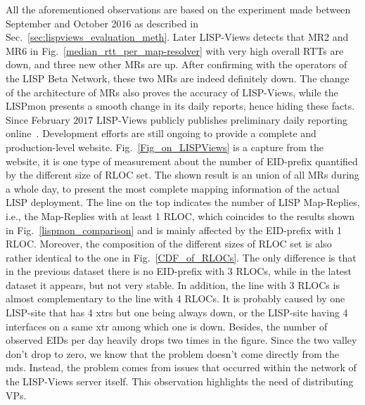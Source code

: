 All the aforementioned observations are based on the experiment made between
September and October 2016 as described in Sec.~\ref{sec:lispviews_evaluation_meth}.
Later LISP-Views detects that MR2 and MR6 in
Fig.~\ref{median_rtt_per_map-resolver} with very high overall RTTs are down,
and three new other MRs are up. After confirming with the operators of the LISP
Beta Network, these two MRs are indeed definitely down. The change of the
architecture of MRs also proves the accuracy of LISP-Views, while the LISPmon
presents a smooth change in its daily reports, hence hiding these facts. Since
February $2017$ LISP-Views publicly publishes preliminary daily reporting
online~\cite{lispviews}. Development efforts are still ongoing to provide a
complete and production-level website. Fig.~\ref{Fig_on_LISPViews} is a capture
from the website, it is one type of measurement about the number of EID-prefix
quantified by the different size of RLOC set. The shown result is an union of
all MRs during a whole day, to present the most complete mapping information of
the actual LISP deployment. The line on the top indicates the number of LISP
Map-Replies, i.e., the Map-Replies with at least 1 RLOC, which coincides to
the results shown in Fig.~\ref{lispmon_comparison} and is mainly affected by
the EID-prefix with 1 RLOC.  Moreover, the composition of the different sizes
of RLOC set is also rather identical to the one in Fig.~\ref{CDF_of_RLOCs}. The
only difference is that in the previous dataset there is no EID-prefix with 3
RLOCs, while in the latest dataset it appears, but not very stable. In
addition, the line with 3 RLOCs is almost complementary to the line with 4
RLOCs. It is probably caused by one LISP-site that has 4 \acrshort{xtr}s but one being
always down, or the LISP-site having 4 interfaces on a same \acrshort{xtr} among which
one is down. Besides, the number of observed EIDs per day heavily drops two
times in the figure. Since the two valley don't drop to zero, we know that the
problem doesn't come directly from the \acrshort{mds}. Instead, the problem comes from
issues that occurred within the network of the LISP-Views server itself. This
observation highlights the need of distributing VPs.


